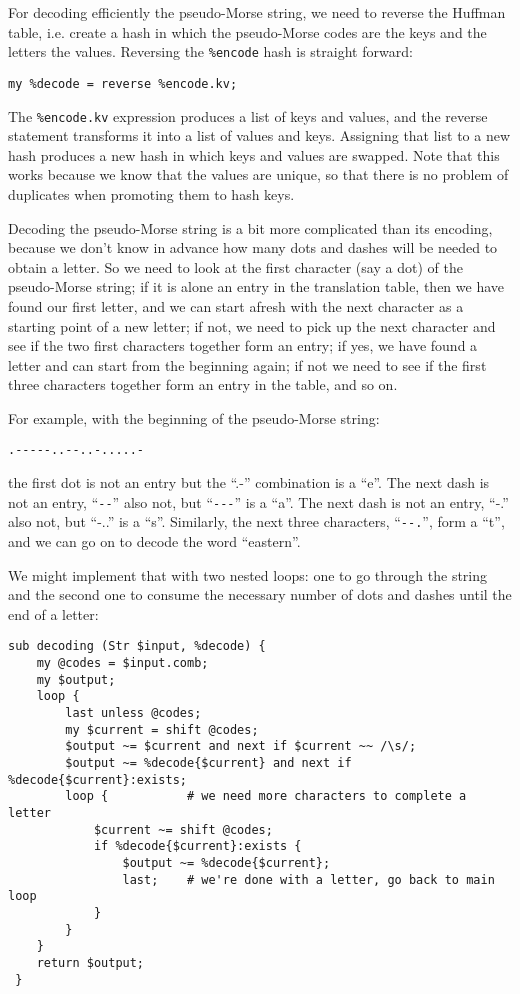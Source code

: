 For decoding efficiently the pseudo-Morse string, we need to reverse 
the Huffman table, i.e. create a hash in which the pseudo-Morse codes 
are the keys and the letters the values. Reversing the \verb'%encode' 
hash is straight forward:

\begin{verbatim}
my %decode = reverse %encode.kv;
\end{verbatim}

The \verb'%encode.kv' expression produces a list of keys and values, 
and the reverse statement transforms it into a list of values and 
keys. Assigning that list to a new hash produces a new hash in 
which keys and values are swapped. Note that this works because 
we know that the values are unique, so that there is no problem 
of duplicates when promoting them to hash keys.

Decoding the pseudo-Morse string is a bit more complicated than 
its encoding, because we don't know in advance how many dots and 
dashes will be needed to obtain a letter. So we need to look at the 
first character (say a dot) of the pseudo-Morse string; if it is alone an 
entry in the translation table, then we have found our first 
letter, and we can start afresh with the next character as a starting 
point of a new letter; if not, we need to pick up the next character 
and see if the two first characters together form an entry; if yes, 
we have found a letter and can start from the beginning again; if 
not we need to see if the first three characters together form an 
entry in the table, and so on.

For example, with the beginning of the pseudo-Morse string:
\begin{verbatim}
.-----..--..-.....-
\end{verbatim}
the first dot is not an entry but the ``.-'' combination is a ``e''.
The next dash is not an entry, ``\verb"--"'' also not, but 
``\verb"---"'' is a ``a''.
The next dash is not an entry, ``-.'' also not, but ``-..'' is a ``s''. 
Similarly, the next three characters, ``\verb"--."'', form a ``t'', and we 
can go on to decode the word ``eastern''.

We might implement that with two nested loops: one to go through the 
string and the second one to consume the necessary number of dots and 
dashes until the end of a letter:

\begin{verbatim}
sub decoding (Str $input, %decode) {
    my @codes = $input.comb;
    my $output;
    loop {
        last unless @codes;
        my $current = shift @codes;
        $output ~= $current and next if $current ~~ /\s/;
        $output ~= %decode{$current} and next if %decode{$current}:exists;
        loop {           # we need more characters to complete a letter
            $current ~= shift @codes;
            if %decode{$current}:exists {
                $output ~= %decode{$current};
                last;    # we're done with a letter, go back to main loop
            }
        }
    }
    return $output;
 }
\end{verbatim}

